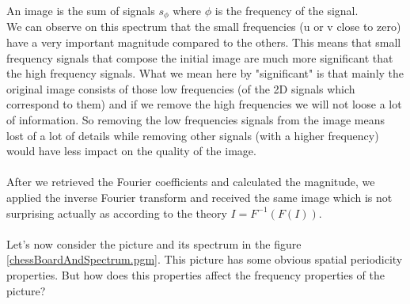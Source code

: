 \documentclass[a4paper]{article}
\begin{document}
        An image is the sum of signals $s_{\phi}$ where $\phi$ is the frequency of the signal.\\
        We can observe on this spectrum that the small frequencies (u or v close to zero) have a very important magnitude compared to the others.  This means that small frequency signals that compose the initial image are much more significant that the high frequency signals.   What we mean here by "significant" is that mainly the original image consists of those low frequencies (of the 2D signals which correspond to them) and if we remove the high frequencies we will not loose a lot of information. So removing the low frequencies signals from the image means lost of a lot of details while removing other signals (with a higher frequency) would have less impact on the quality of the image.\\\\
After we retrieved the Fourier coefficients and calculated the magnitude, we applied the inverse Fourier transform and received the same image which is not surprising actually as according to the theory $I = F^{-1}(F(I))$.\\\\
        Let's now consider the picture and its spectrum in the figure \ref{chessBoardAndSpectrum.pgm}. This picture has some obvious spatial periodicity properties. But how does this properties affect the frequency properties of the picture?
\end{document}
